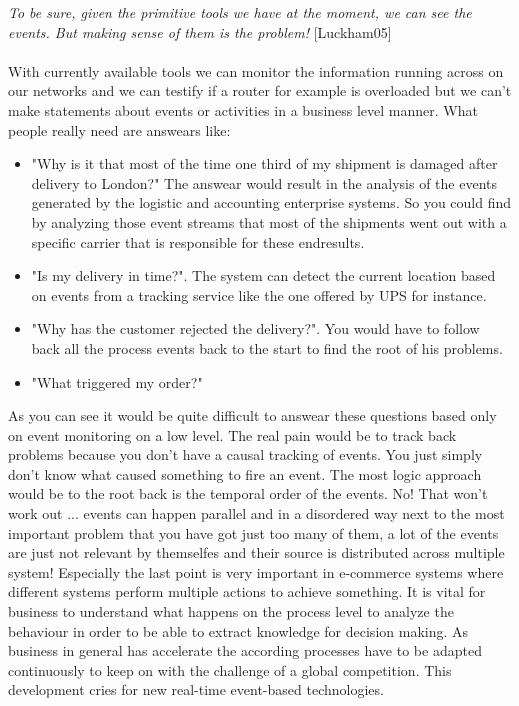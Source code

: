 \documentclass[a4paper,titlepage,11pt,DIV10,BCOR0.5cm,headinclude]{article}
\begin{document}
\textit{To be sure, given the primitive tools we have at the moment, we can see the events. But making sense of them is the problem!} [Luckham05]
\\\\
With currently available tools we can monitor the information running across on our networks and we can testify if a router for example is overloaded but we can't make statements about events or activities in a business level manner. What people really need are answears like:
\begin{itemize}
	\item "Why is it that most of the time one third of my shipment is damaged after delivery to London?" The answear would result in the analysis of the events generated by the logistic and accounting enterprise systems. So you could find by analyzing those event streams that most of the shipments went out with a specific carrier that is responsible for these endresults.
	\item "Is my delivery in time?". The system can detect the current location based on events from a tracking service like the one offered by UPS for instance.
	\item "Why has the customer rejected the delivery?". You would have to follow back all the process events back to the start to find the root of his problems.
	\item "What triggered my order?"
\end{itemize}
As you can see it would be quite difficult to answear these questions based only on event monitoring on a low level. The real pain would be to track back problems because you don't have a causal tracking of events. You just simply don't know what caused something to fire an event. The most logic approach would be to the root back is the temporal order of the events. No! That won't work out ... events can happen parallel and in a disordered way next to the most important problem that you have got just too many of them, a lot of the events are just not relevant by themselfes and their source is distributed across multiple system! Especially the last point is very important in e-commerce systems where different systems perform multiple actions to achieve something. It is vital for business to understand what happens on the process level to analyze the behaviour in order to be able to extract knowledge for decision making. As business in general has accelerate the according processes have to be adapted continuously to keep on with the challenge of a global competition. This development cries for new real-time event-based technologies.
\end{document}

